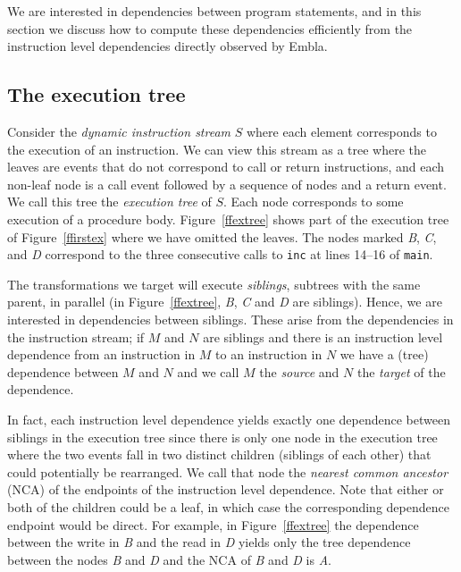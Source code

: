 \documentclass{acm_proc_article-sp}
\begin{document}
We are interested in dependencies between program statements, and in 
this section we discuss how to compute these dependencies efficiently from
the instruction level dependencies directly observed by Embla.

\subsection{The execution tree}

Consider the {\em dynamic instruction stream} $S$ where each element 
corresponds to the execution
of an instruction. We can view this stream as a tree where the leaves are 
events that do not correspond to call or return instructions, and each 
non-leaf node is a call
event followed by a sequence of nodes and a return event. We call
this tree the {\em execution tree} of $S$. 
Each node corresponds to some execution of a procedure body.
Figure~\ref{ffextree} shows part of
the execution tree of Figure~\ref{ffirstex} where we have omitted the 
leaves. The nodes marked {\it B}, {\it C}, and {\it D} correspond to 
the three consecutive calls to {\tt inc} at lines 14--16 of {\tt main}.

The transformations we target will execute {\em siblings}, subtrees with
the same parent, in parallel (in Figure~\ref{ffextree}, {\it B}, {\it C} 
and {\it D} are siblings).  Hence, we 
are interested in dependencies between siblings. These
arise from the 
dependencies in the instruction stream; if $M$ and $N$ are siblings and
there is an instruction level dependence from an instruction in $M$ 
to an instruction in $N$ we have a (tree) dependence between $M$ and $N$
and we call $M$ the {\em source} and $N$ the {\em target} of the dependence.

In fact, each instruction level dependence yields exactly one dependence
between siblings in the execution tree since there is only one node
in the execution tree  
where the two events fall in two distinct children (siblings of each other)
that could potentially be rearranged. We call that node the {\em nearest
common ancestor} (NCA) of the endpoints of the instruction level dependence.
Note that either or both of the children could be a leaf, in which case the
corresponding dependence endpoint would be direct.
For example, in Figure~\ref{ffextree}
the dependence between the write in {\it B} and the read in {\it D} yields
only the tree dependence between the nodes {\it B} and {\it D} and the NCA of
{\it B} and {\it D} is {\it A}. 
\end{document}
